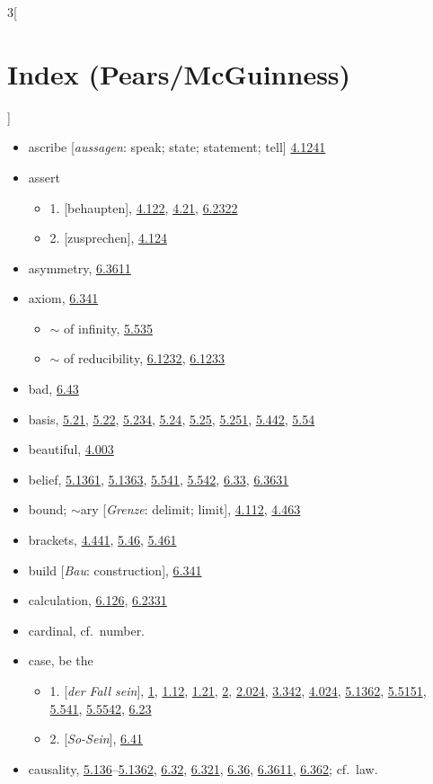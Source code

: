 \documentclass[oneside,openany,12pt]{book}
\newcommand{\indexentry}[1]{\item #1}
\newcommand{\indexsubentry}[1]{\begin{itemize} \item #1 \end{itemize}}
\newcommand{\indexref}[1]{\hyperlink{prop#1}{#1}}
\newcommand{\indexgap}{\bigskip}
\begin{document}
\begin{multicols}{3}[\section*{Index (Pears/McGuinness)}]
\begin{itemize}
\indexentry{ascribe [\textit{aussagen}: speak; state; statement; tell] \indexref{4.1241}}

\indexentry{assert}

   \indexsubentry{1. [behaupten],  \indexref{4.122}, \indexref{4.21}, \indexref{6.2322}}

   \indexsubentry{2. [zusprechen], \indexref{4.124}}

\indexentry{asymmetry, \indexref{6.3611}}

\indexentry{axiom, \indexref{6.341}}

   \indexsubentry{$\sim$ of infinity, \indexref{5.535}}

   \indexsubentry{$\sim$ of reducibility, \indexref{6.1232}, \indexref{6.1233}}

\indexgap

\indexentry{bad, \indexref{6.43}}

\indexentry{basis, \indexref{5.21}, \indexref{5.22}, \indexref{5.234}, \indexref{5.24}, \indexref{5.25}, \indexref{5.251}, \indexref{5.442}, \indexref{5.54}}

\indexentry{beautiful, \indexref{4.003}}

\indexentry{belief, \indexref{5.1361}, \indexref{5.1363}, \indexref{5.541}, \indexref{5.542}, \indexref{6.33}, \indexref{6.3631}}

\indexentry{bound; $\sim$ary [\textit{Grenze}: delimit; limit], \indexref{4.112}, \indexref{4.463}}

\indexentry{brackets, \indexref{4.441}, \indexref{5.46}, \indexref{5.461}}

\indexentry{build [\textit{Bau}: construction], \indexref{6.341}}

\indexgap

\indexentry{calculation, \indexref{6.126}, \indexref{6.2331}}

\indexentry{cardinal, cf.\ number.}

\indexentry{case, be the}

   \indexsubentry{1. [\textit{der Fall sein}], \indexref{1}, \indexref{1.12}, \indexref{1.21}, \indexref{2}, \indexref{2.024}, \indexref{3.342}, \indexref{4.024}, \indexref{5.1362}, \indexref{5.5151}, \indexref{5.541}, \indexref{5.5542}, \indexref{6.23}}

   \indexsubentry{2. [\textit{So-Sein}], \indexref{6.41}}

\indexentry{causality, \indexref{5.136}--\indexref{5.1362}, \indexref{6.32}, \indexref{6.321}, \indexref{6.36}, \indexref{6.3611}, \indexref{6.362}; cf.\ law.}


\end{itemize}
\end{multicols}
\end{document}
